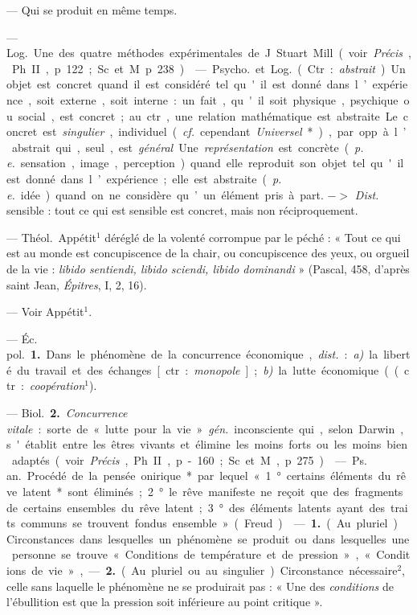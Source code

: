 \begin{itemize}[leftmargin=1cm, label=, itemsep=11pt]
 — Qui se produit en
même temps.

 — \si{Log.}
Une des quatre méthodes expérimentales de J. Stuart Mill (voir
{\it Précis}, Ph. II, p. 122; Sc. et M.
p. 238).

 — \si{Psycho.} et \si{Log.} (Ctr. :
{\it abstrait}). Un objet est concret quand
il est considéré tel qu'il est donné
dans l’expérience, soit externe, soit
interne : un fait, qu'il soit physique,
psychique ou social, est concret; au
ctr., une relation mathématique est
abstraite. Le concret est {\it singulier},
individuel ({\it cf.} cependant {\it Universel}*),
par opp. à l’abstrait qui, seul, est
{\it général}. Une {\it représentation} est concrète ({\it p. e.} sensation, image, perception) quand elle reproduit son
objet tel qu'il est donné dans l’expérience; elle est abstraite ({\it p. e.} idée)
quand on ne considère qu’un élément pris à part. $->$ {\it Dist.} sensible : tout ce qui est sensible est
concret, mais non réciproquement.

 — \si{Théol.} Appétit$^1$ déréglé de la volenté corrompue par
le péché : « Tout ce qui est au
monde est concupiscence de la chair,
ou concupiscence des yeux, ou
orgueil de la vie : {\it libido sentiendi,
libido sciendi, libido dominandi} »
(Pascal, 458, d’après saint Jean,
{\it Épitres}, I, 2, 16).

 — Voir Appétit$^1$.

 — \si{Éc. pol.} {\bf 1.} Dans le
phénomène de la concurrence économique, {\it dist.} : {\it a)} la liberté du travail
et des échanges [ctr. : {\it monopole}];
{\it b)} la lutte économique ((ctr. : {\it coopération}$^1$).

— \si{Biol.} {\bf 2.} {\it Concurrence vitale} :
sorte de « lutte pour la vie »  {\it gén.}
inconsciente qui, selon Darwin,
s'établit entre les êtres vivants et
élimine les moins forts ou les moins
bien adaptés (voir  {\it Précis}, Ph. II,
p- 160; Sc. et M., p. 275).

 — \si{Ps. an.} Procédé de
la pensée onirique* par lequel
« 1° certains éléments du rêve latent*
sont éliminés; 2° le rêve manifeste
ne reçoit que des fragments de certains ensembles du rêve latent;
3° des éléments latents ayant des
traits communs se trouvent fondus
ensemble » (Freud).

 — {\bf 1.} (Au pluriel). Circonstances dans lesquelles un phénomène se produit ou dans lesquelles une personne se trouve
« Conditions de température et de
pression », « Conditions de vie », —
 {\bf 2.} (Au pluriel ou au singulier). Circonstance nécessaire$^2$, celle sans
laquelle le phénomène ne se produirait
pas : « Une des {\it conditions} de
l'ébullition est que la pression soit
inférieure au point critique ».


\end{itemize}
